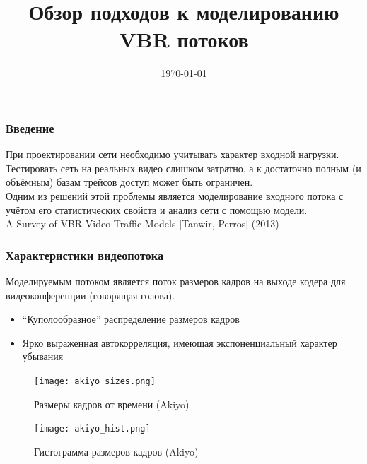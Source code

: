\documentclass[10pt,pdf,hyperref={unicode}]{beamer}
\begin{document}
\title[VBR Modelling]
{Обзор подходов к моделированию VBR потоков}
\date{\today}

\frame{\titlepage}

\begin{frame}
    \frametitle{Введение}
    При проектировании сети необходимо учитывать характер
    входной нагрузки. Тестировать сеть на реальных видео
    слишком затратно, а к достаточно полным (и объёмным)
    базам трейсов доступ может быть ограничен.\\[0.5 cm]

    Одним из решений этой проблемы является моделирование
    входного потока с учётом его статистических свойств
    и анализ сети с помощью модели.\\[0.5 cm]

    A Survey of VBR Video Traffic Models [Tanwir, Perros] (2013)
\end{frame}

\begin{frame}
    \frametitle{Характеристики видеопотока}
    Моделируемым потоком является поток размеров
    кадров на выходе кодера для видеоконференции
    (говорящая голова).
    \begin{itemize}
        \item ``Куполообразное'' распределение размеров кадров
        \item Ярко выраженная автокорреляция, имеющая экспоненциальный
            характер убывания
    \end{itemize}
\end{frame}

\begin{frame}
    \begin{figure}[h]
        \begin{center}
            \texttt{[image: akiyo\_sizes.png]}
        \end{center}
        \caption{Размеры кадров от времени (Akiyo)}
        \label{fig:akiyo_sizes}
    \end{figure}
\end{frame}

\begin{frame}
    \begin{figure}[h]
        \begin{center}
            \texttt{[image: akiyo\_hist.png]}
        \end{center}
        \caption{Гистограмма размеров кадров (Akiyo)}
        \label{fig:akiyo_hist}
    \end{figure}
\end{frame}
\end{document}
